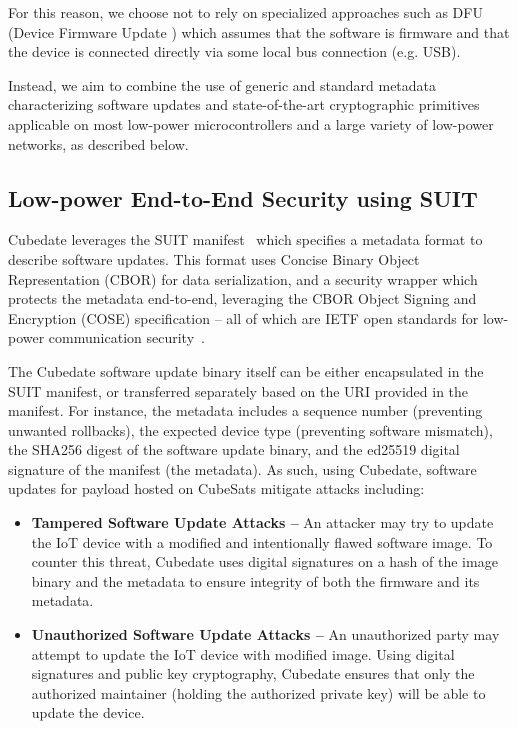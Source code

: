 For this reason, we choose not to rely on specialized approaches such as DFU (Device Firmware Update \cite{beningo2018dfu}) which assumes that the software is firmware and that the device is connected directly via some local bus connection (e.g. USB).

Instead, we aim to combine the use of generic and standard metadata characterizing software updates and state-of-the-art cryptographic primitives applicable on most low-power microcontrollers and a large variety of low-power networks, as described below.

\subsection{Low-power End-to-End Security using SUIT}

Cubedate leverages the SUIT manifest~\cite{suit-manifest} which specifies a metadata format to describe software updates. This format uses Concise Binary Object Representation (CBOR) for data serialization, and a security wrapper which protects the metadata end-to-end, leveraging the CBOR Object Signing and Encryption (COSE) specification -- all of which are IETF open standards for low-power communication security~\cite{tschofenig2019cyberphysical}.

The Cubedate software update binary itself can be either encapsulated in the SUIT manifest, or transferred separately based on the URI provided in the manifest.
For instance, the metadata includes a sequence number (preventing unwanted rollbacks), the expected device type (preventing software mismatch), the SHA256 digest of the software update binary, and the ed25519 digital signature of the manifest (the metadata).
As such, using Cubedate, software updates for payload hosted on CubeSats mitigate attacks including:

\begin{itemize}
\item {\bf Tampered Software Update Attacks –} An attacker may try to update the IoT device with a modified and intentionally flawed software image. To counter this threat, Cubedate uses digital signatures on a hash of the image binary and the metadata to ensure integrity of both the firmware and its metadata.

\item {\bf Unauthorized Software Update Attacks –} An unauthorized party may attempt to update the IoT device with modified image. Using digital signatures and public key cryptography, Cubedate ensures that only the authorized maintainer (holding the authorized private key) will be able to update the device.
\end{itemize}

